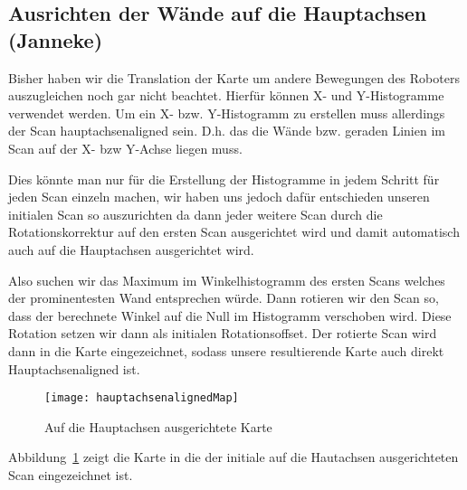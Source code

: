 \subsection{Ausrichten der Wände auf die Hauptachsen (Janneke)}

Bisher haben wir die Translation der Karte um andere Bewegungen des Roboters auszugleichen noch gar nicht beachtet. Hierfür können X- und Y-Histogramme verwendet werden. Um ein X- bzw. Y-Histogramm zu erstellen muss allerdings der Scan hauptachsenaligned sein. D.h. das die Wände bzw. geraden Linien im Scan auf der X- bzw Y-Achse liegen muss.

Dies könnte man nur für die Erstellung der Histogramme in jedem Schritt für jeden Scan einzeln machen, wir haben uns jedoch dafür entschieden unseren initialen Scan so auszurichten da dann jeder weitere Scan durch die Rotationskorrektur auf den ersten Scan ausgerichtet wird und damit automatisch auch auf die Hauptachsen ausgerichtet wird.

Also suchen wir das Maximum im Winkelhistogramm des ersten Scans welches der prominentesten Wand entsprechen würde. Dann rotieren wir den Scan so, dass der berechnete Winkel auf die Null im Histogramm verschoben wird. Diese Rotation setzen wir dann als initialen Rotationsoffset. Der rotierte Scan wird dann in die Karte eingezeichnet, sodass unsere resultierende Karte auch direkt Hauptachsenaligned ist.

\begin{figure}
	\centering
	\texttt{[image: hauptachsenalignedMap]}
	\caption{Auf die Hauptachsen ausgerichtete Karte}
	\label{fig:Hauptachsenaligned}
\end{figure}

Abbildung~\ref{fig:Hauptachsenaligned} zeigt die Karte in die der initiale auf die Hautachsen ausgerichteten Scan eingezeichnet ist.